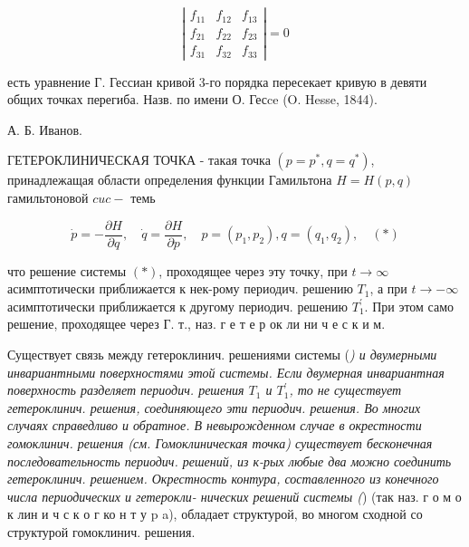 \documentclass[10pt]{article}
\begin{document}
\[

\left|\begin{array}{lll}

f_{11} & f_{12} & f_{13} \\

f_{21} & f_{22} & f_{23} \\

f_{31} & f_{32} & f_{33}

\end{array}\right|=0

\]



есть уравнение Г. Гессиан кривой 3-го порядка пересекает кривую в девяти общих точках перегиба. Назв. по имени О. Гесce (O. Hesse, 1844).



А. Б. Иванов.



ГЕТЕРОКЛИНИЧЕСКАЯ ТОЧКА - такая точка $\left(p=p^{*}, q=q^{*}\right)$, принадлежащая области определения функции Гамильтона $H=H(p, q)$ гамильтоновой $c u c-$ темь



\[

\dot{p}=-\frac{\partial H}{\partial q}, \quad \dot{q}=\frac{\partial H}{\partial p}, \quad p=\left(p_{1}, p_{2}\right), q=\left(q_{1}, q_{2}\right), \quad(*)

\]



что решение системы $(*)$, проходящее через эту точку, при $t \rightarrow \infty$ асимптотически приближается к нек-рому периодич. решению $T_{1}$, а при $t \rightarrow-\infty$ асимптотически приближается к другому периодич. решению $T_{1}^{\prime}$. При этом само решение, проходящее через Г. т., наз. г е т е р ок ли ни ч е с к и м.



Существует связь между гетероклинич. решениями системы (\textit{) и двумерными инвариантными поверхностями этой системы. Если двумерная инвариантная поверхность разделяет периодич. решения $T_{1}$ и $T_{1}^{\prime}$, то не существует гетероклинич. решения, соединяющего эти периодич. решения. Во многих случаях справедливо и обратное. В невырожденном случае в окрестности гомоклинич. решения (см. Гомоклиническая точка) существует бесконечная последовательность периодич. решений, из к-рых любые два можно соединить гетероклинич. решением. Окрестность контура, составленного из конечного числа периодических и гетерокли- нических решений системы (}) (так наз. г о м о к лин и ч с к о г ко н т у p a), обладает структурой, во многом сходной со структурой гомоклинич. решения.
\end{document}
